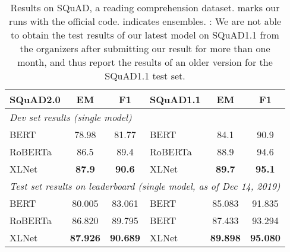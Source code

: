 \documentclass{article}
\begin{document}
\begin{table}[t!h]
  \small
  \centering
  
  \begin{tabular}{lcc|lcc}
    \toprule
    \bf SQuAD2.0 & \bf EM & \bf F1 & \bf SQuAD1.1 & \bf EM & \bf F1 \\
    \midrule
    \multicolumn{6}{l}{\it Dev set results (single model)} \\
    BERT \cite{devlin2018bert} & 78.98 & 81.77 & BERT \cite{devlin2018bert} & 84.1 & 90.9 \\
    RoBERTa~\cite{liu2019roberta} & 86.5 & 89.4 & RoBERTa \cite{liu2019roberta}  & 88.9 & 94.6 \\
    XLNet & \bf 87.9 & \bf 90.6 & XLNet & \bf 89.7 & \bf 95.1 \\
    \midrule
    \multicolumn{6}{l}{\it Test set results on leaderboard (single model, as of Dec 14, 2019)} \\
    BERT~\cite{devlin2018bert} & 80.005 & 83.061 & BERT~\cite{devlin2018bert} & 85.083 & 91.835 \\
    RoBERTa~\cite{liu2019roberta} & 86.820 & 89.795 & BERT~\cite{devlin2018bert} & 87.433 & 93.294 \\
    XLNet & \bf 87.926 & \bf 90.689 & XLNet & \bf 89.898 & \bf 95.080 \\
    \bottomrule
  \end{tabular}
  \caption{\small
Results on SQuAD, a reading comprehension dataset.
     marks our runs with the official code.  indicates ensembles.
    : We are not able to obtain the test results of our latest model on SQuAD1.1 from the organizers after submitting our result for more than one month, and thus report the results of an older version for the SQuAD1.1 test set.
  }
  \label{tab:sota-squad}
\end{table}
\end{document}

